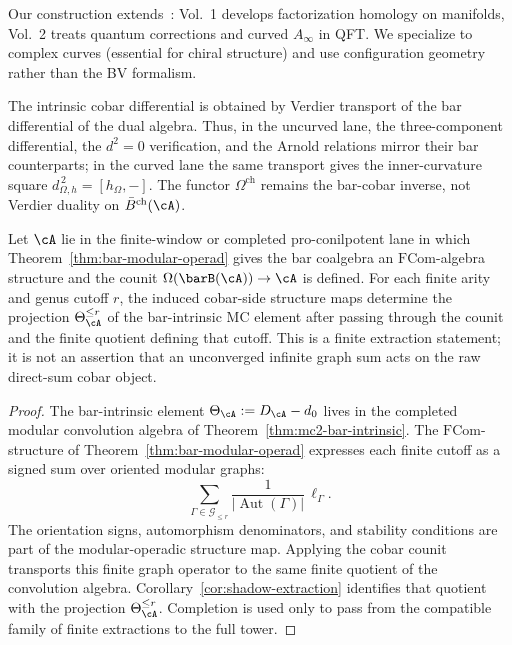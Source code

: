 \begin{remark}\label{rem:CG-factorization-detailed}
Our construction extends~\cite{CG17}: Vol.~1 develops factorization homology on manifolds, Vol.~2 treats quantum corrections and curved $A_\infty$ in QFT. We specialize to complex curves (essential for chiral structure) and use configuration geometry rather than the BV formalism.
\end{remark}

\begin{remark}
The intrinsic cobar differential is obtained by Verdier transport of
the bar differential of the dual algebra. Thus, in the uncurved lane,
the three-component differential, the $d^2 = 0$ verification, and the
Arnold relations mirror their bar counterparts; in the curved lane the
same transport gives the inner-curvature square
$d_{\Omega,h}^{\,2}=[h_\Omega,-]$.
The functor $\Omega^{\mathrm{ch}}$ remains the bar-cobar inverse, not
Verdier duality on $\barBch(\cA)$.
\end{remark}

\begin{proposition}
\label{prop:cobar-modular-shadow}
\ClaimStatusConditional
Let $\cA$ lie in the finite-window or completed pro-conilpotent lane in
which Theorem~\ref{thm:bar-modular-operad} gives the bar coalgebra an
$\mathrm{FCom}$-algebra structure and the counit
$\Omega(\barB(\cA))\to\cA$ is defined. For each finite arity and genus
cutoff $r$, the induced cobar-side structure maps determine the
projection $\Theta_\cA^{\le r}$ of the bar-intrinsic MC element after
passing through the counit and the finite quotient defining that
cutoff. This is a finite extraction statement; it is not an assertion
that an unconverged infinite graph sum acts on the raw direct-sum
cobar object.
\end{proposition}

\begin{proof}
The bar-intrinsic element
$\Theta_\cA:=D_\cA-d_0$ lives in the completed modular convolution
algebra of Theorem~\ref{thm:mc2-bar-intrinsic}. The
$\mathrm{FCom}$-structure of Theorem~\ref{thm:bar-modular-operad}
expresses each finite cutoff as a signed sum over oriented modular
graphs:
\[
\sum_{\Gamma\in\mathcal G_{\le r}}
\frac{1}{|\operatorname{Aut}(\Gamma)|}\,\ell_\Gamma .
\]
The orientation signs, automorphism denominators, and stability
conditions are part of the modular-operadic structure map. Applying
the cobar counit transports this finite graph operator to the same
finite quotient of the convolution algebra. Corollary~\ref{cor:shadow-extraction}
identifies that quotient with the projection
$\Theta_\cA^{\le r}$. Completion is used only to pass from the
compatible family of finite extractions to the full tower.
\end{proof}

